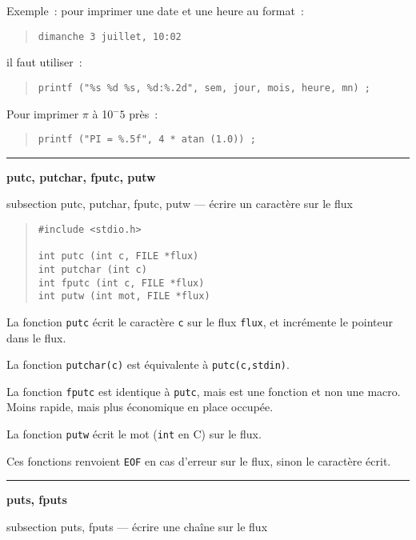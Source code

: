 \documentclass [twoside] {report}
\newcommand {\primitive} [1]
    {
	{\large \bf #1}
	\addcontentsline {toc} {subsection} {#1}
    }
\newcommand {\separation}
    {
	\vspace {7mm}
	\nopagebreak
	\hrule
    }
\begin{document}
Exemple~: pour imprimer une date et une heure au format~: \par
\begin {quote}
\begin {verbatim}
dimanche 3 juillet, 10:02
\end{verbatim}
\end {quote}

il faut utiliser~:

\begin {quote}
\begin {verbatim}
printf ("%
\end{verbatim}
\end {quote}

Pour imprimer $\pi$ à 10$^-5$ près~:

\begin {quote}
\begin {verbatim}
printf ("PI = %
\end{verbatim}
\end {quote}


\separation
\primitive {putc, putchar, fputc, putw} --- écrire un caractère sur le flux

\begin {quote}
\begin {verbatim}
#include <stdio.h>

int putc (int c, FILE *flux)
int putchar (int c)
int fputc (int c, FILE *flux)
int putw (int mot, FILE *flux)
\end{verbatim}
\end {quote}

La fonction {\tt putc} écrit le caractère {\tt c} sur le flux
{\tt flux}, et incrémente le pointeur dans le flux.

La fonction {\tt putchar(c)} est équivalente à {\tt putc(c,stdin)}.

La fonction {\tt fputc} est identique à {\tt putc}, mais est une
fonction et non une macro. Moins rapide, mais plus
économique en place occupée.

La fonction {\tt putw} écrit le mot ({\tt int} en C) sur le flux.

Ces fonctions renvoient {\tt EOF} en cas d'erreur sur le flux,
sinon le caractère écrit.


\separation
\primitive {puts, fputs} --- écrire une chaîne sur le flux
\end{document}
